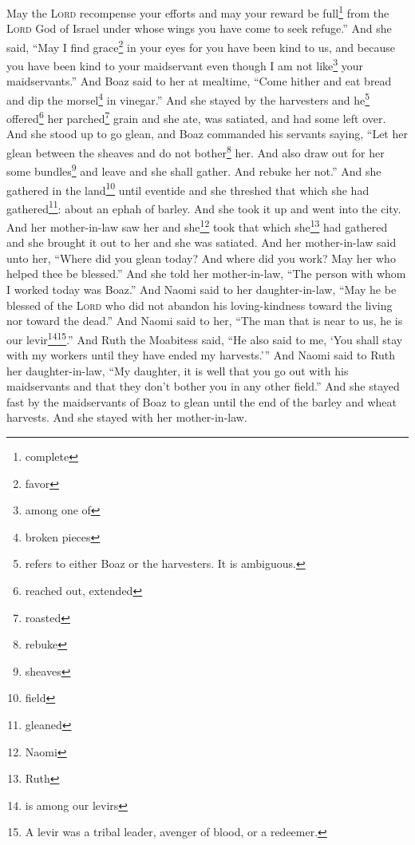 \begin{inparaenum}
     May the \textsc{Lord} recompense your efforts and may your reward be full\footnote{complete} from the \textsc{Lord} God of Israel under whose wings you have come to seek refuge.''%
     And she said, ``May I find grace\footnote{favor} in your eyes for you have been kind to us, and because you have been kind to your maidservant even though I am not like\footnote{among one of} your maidservants.''%
     And Boaz said to her at mealtime, ``Come hither and eat bread and dip the morsel\footnote{broken pieces} in vinegar.'' And she stayed by the harvesters and he\footnote{refers to either Boaz or the harvesters. It is ambiguous.} offered\footnote{reached out, extended} her parched\footnote{roasted} grain and she ate, was satiated, and had some left over.%
     And she stood up to go glean, and Boaz commanded his servants saying, ``Let her glean between the sheaves and do not bother\footnote{rebuke} her.%
     And also draw out for her some bundles\footnote{sheaves} and leave and she shall gather. And rebuke her not.''%
     And she gathered in the land\footnote{field} until eventide and she threshed that which she had gathered\footnote{gleaned}: about an ephah of barley.%
     And she took it up and went into the city. And her mother-in-law saw her and she\footnote{Naomi} took that which she\footnote{Ruth} had gathered and she brought it out to her and she was satiated.%
     And her mother-in-law said unto her, ``Where did you glean today? And where did you work? May her who helped thee be blessed.'' And she told her mother-in-law, ``The person with whom I worked today was Boaz.''%
     And Naomi said to her daughter-in-law, ``May he be blessed of the \textsc{Lord} who did not abandon his loving-kindness toward the living nor toward the dead.'' And Naomi said to her, ``The man that is near to us, he is our levir\footnote{is among our levirs}\footnote{A levir was a tribal leader, avenger of blood, or a redeemer.}.''%
     And Ruth the Moabitess said, ``He also said to me, `You shall stay with my workers until they have ended my harvests.'''%
     And Naomi said to Ruth her daughter-in-law, ``My daughter, it is well that you go out with his maidservants and that they don't bother you in any other field.''%
     And she stayed fast by the maidservants of Boaz to glean until the end of the barley and wheat harvests. And she stayed with her mother-in-law.%
\end{inparaenum}
